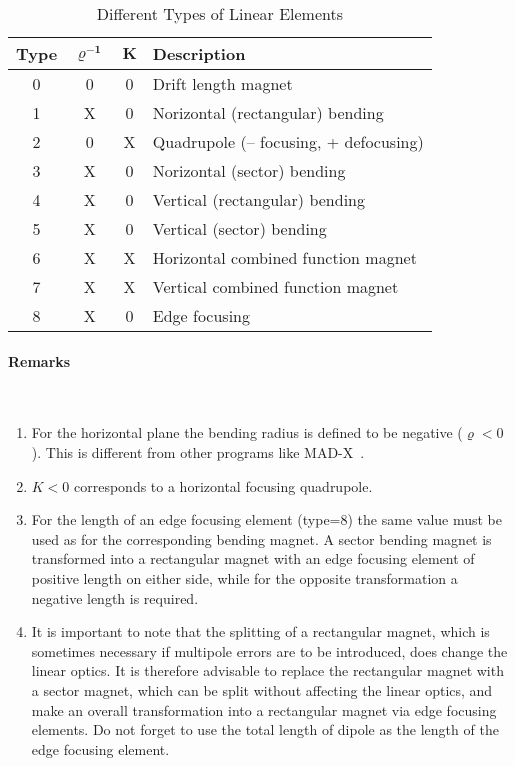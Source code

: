 \begin{table}[h]
    \caption{Different Types of Linear Elements}
    \label{T-LinEle}
    \centering
    \renewcommand{\arraystretch}{1.5}
    \begin{tabular}{|c|c|c|l|}
        \hline
        \rowcolor{blue!30}
        \textbf{Type} & $\mathbf{\varrho^{-1}}$ & $\mathbf{K}$ & \textbf{Description} \\
        \hline
        0 & 0 & 0 & Drift length magnet \\
        \hline
        1 & X & 0 & Norizontal (rectangular) bending \\
        \hline
        2 & 0 & X & Quadrupole (-- focusing, + defocusing) \\
        \hline
        3 & X & 0 & Norizontal (sector) bending \\
        \hline
        4 & X & 0 & Vertical (rectangular) bending \\
        \hline
        5 & X & 0 & Vertical (sector) bending \\
        \hline
        6 & X & X & Horizontal combined function magnet \\
        \hline
        7 & X & X & Vertical combined function magnet \\
        \hline
        8 & X & 0 & Edge focusing \\
        \hline
    \end{tabular}
\end{table}

\paragraph{Remarks}~
\begin{enumerate}
    \item For the horizontal plane the bending radius is defined to be negative \mbox{($\varrho < 0$).} This is different from other programs like MAD-X~\cite{MAD}.
    \item $K < 0 $ corresponds to a horizontal focusing quadrupole.
    \item For the length of an edge focusing element (type=8) the same value must be used as for the corresponding bending magnet. A sector bending magnet is transformed into a rectangular magnet with an edge focusing element of positive length on either side, while for the opposite transformation a negative length is required.
    \item It is important to note that the splitting of a rectangular magnet, which is sometimes necessary if multipole errors are to be introduced, does change the linear optics. It is therefore advisable to replace the rectangular magnet with a sector magnet, which can be split without affecting the linear optics, and make an overall transformation into a rectangular magnet via edge focusing elements. Do not forget to use the total length of dipole as the length of the edge focusing element.
\end{enumerate}


